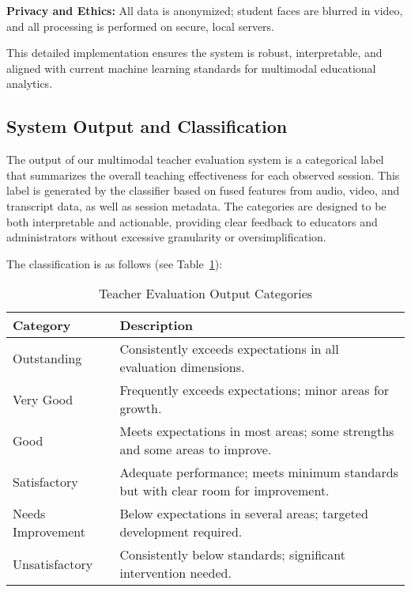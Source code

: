 \textbf{Privacy and Ethics:}  
All data is anonymized; student faces are blurred in video, and all processing is performed on secure, local servers.

This detailed implementation ensures the system is robust, interpretable, and aligned with current machine learning standards for multimodal educational analytics.

\subsection{System Output and Classification}

The output of our multimodal teacher evaluation system is a categorical label that summarizes the overall teaching effectiveness for each observed session. This label is generated by the classifier based on fused features from audio, video, and transcript data, as well as session metadata. The categories are designed to be both interpretable and actionable, providing clear feedback to educators and administrators without excessive granularity or oversimplification.

The classification is as follows (see Table~\ref{tab:output_categories}):

\begin{table}[t]
    \centering
    \normalsize
    \caption{Teacher Evaluation Output Categories}
    \label{tab:output_categories}
    \begin{tabular}{p{2.2cm} p{7.1cm}}
        \toprule
        \textbf{Category} & \textbf{Description} \\
        \midrule
        Outstanding & Consistently exceeds expectations in all evaluation dimensions. \\
        Very Good & Frequently exceeds expectations; minor areas for growth. \\
        Good & Meets expectations in most areas; some strengths and some areas to improve. \\
        Satisfactory & Adequate performance; meets minimum standards but with clear room for improvement. \\
        Needs Improvement & Below expectations in several areas; targeted development required. \\
        Unsatisfactory & Consistently below standards; significant intervention needed. \\
        \bottomrule
    \end{tabular}
\end{table}

